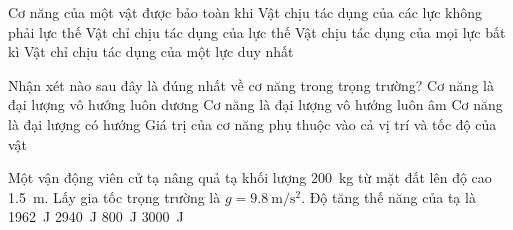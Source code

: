 \begin{ex}
	Cơ năng của một vật được bảo toàn khi
	\choice
	{Vật chịu tác dụng của các lực không phải lực thế}
	{\True Vật chỉ chịu tác dụng của lực thế}
	{Vật chịu tác dụng của mọi lực bất kì}
	{Vật chỉ chịu tác dụng của một lực duy nhất}
	\loigiai{}
\end{ex}
\begin{ex}
	Nhận xét nào sau đây là đúng nhất về cơ năng trong trọng trường?
	\choice
	{Cơ năng là đại lượng vô hướng luôn dương}
	{Cơ năng là đại lượng vô hướng luôn âm}
	{Cơ năng là đại lượng có hướng}
	{\True Giá trị của cơ năng phụ thuộc vào cả vị trí và tốc độ của vật}
	\loigiai{}
\end{ex}
\begin{ex}
	\loigiai{}
\end{ex}
\begin{ex}
	Một vận động viên cử tạ nâng quả tạ khối lượng \SI{200}{\kilogram} từ mặt đất lên độ cao \SI{1.5}{\meter}. Lấy gia tốc trọng trường là $g=\SI{9.8}{\meter/\second^2}$. Độ tăng thế năng của tạ là
	\choice
	{\SI{1962}{\joule}}
	{\True \SI{2940}{\joule}}
	{\SI{800}{\joule}}
	{\SI{3000}{\joule}}
\end{ex}
